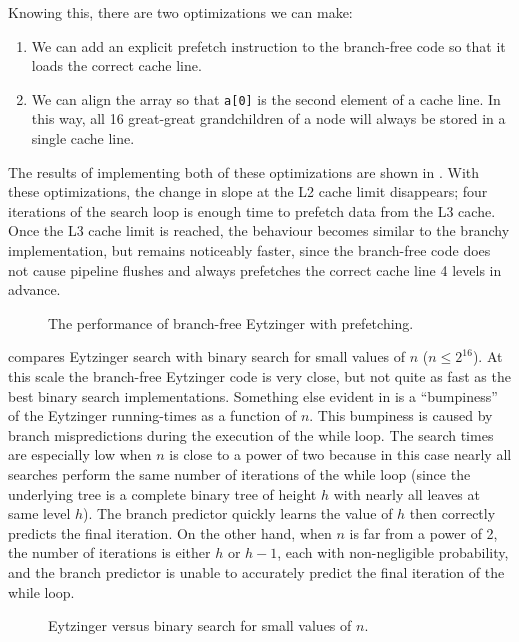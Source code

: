 \documentclass{patmorin}
\begin{document}
Knowing this, there are two optimizations we can make:
\begin{enumerate}
  \item We can add an explicit prefetch instruction to the branch-free code
    so that it loads the correct cache line.
  \item We can align the array so that \texttt{a[0]} is the
    second element of a cache line.  In this way, all 16 great-great
    grandchildren of a node will always be stored in a single cache line.
\end{enumerate}

The results of implementing both of these optimizations are shown in
.  With these optimizations, the change in slope
at the L2 cache limit disappears; four iterations of the search loop
is enough time to prefetch data from the L3 cache.  Once the L3 cache
limit is reached, the behaviour becomes similar to the branchy
implementation, but remains noticeably faster, since the branch-free
code does not cause pipeline flushes and always prefetches the correct
cache line 4 levels in advance.

\begin{figure}
   \caption{The performance of branch-free Eytzinger with prefetching.}
\end{figure}

 compares Eytzinger search with binary search for
small values of $n$ ($n\le 2^{16}$).  At this scale
the branch-free Eytzinger code is very close, but not quite as fast
as the best binary search implementations.  Something else evident in
 is a ``bumpiness'' of the Eytzinger running-times
as a function of $n$.  This bumpiness is caused by branch mispredictions
during the execution of the while loop.  The search times are especially
low when $n$ is close to a power of two because in this case nearly all
searches perform the same number of iterations of the while loop (since
the underlying tree is a complete binary tree of height $h$ with nearly
all leaves at same level $h$).  The branch predictor quickly learns
the value of $h$ then correctly predicts the final iteration.  On the
other hand, when $n$ is far from a power of 2, the number of iterations
is either $h$ or $h-1$, each with non-negligible probability, and the
branch predictor is unable to accurately predict the final iteration of
the while loop.

\begin{figure}
   \caption{Eytzinger versus binary search for small values of $n$.}
\end{figure}
\end{document}
